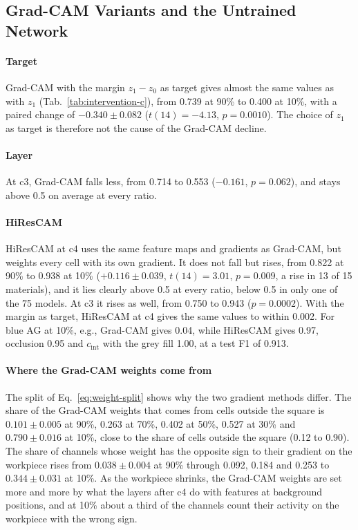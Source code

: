 \subsection{Grad-CAM Variants and the Untrained Network}
\label{sec:results-camvariants}

\paragraph{Target}
Grad-CAM with the margin $z_1 - z_0$ as target gives almost the same values as with
$z_1$ (Tab.~\ref{tab:intervention-c}), from 0.739 at 90\% to 0.400 at 10\%, with a
paired change of $-0.340 \pm 0.082$ ($t(14) = -4.13$, $p = 0.0010$). The choice of
$z_1$ as target is therefore not the cause of the Grad-CAM decline.

\paragraph{Layer}
At c3, Grad-CAM falls less, from 0.714 to 0.553 ($-0.161$, $p = 0.062$), and stays above
0.5 on average at every ratio.

\paragraph{HiResCAM}
HiResCAM at c4 uses the same feature maps and gradients as Grad-CAM, but weights every
cell with its own gradient. It does not fall but rises, from 0.822 at 90\% to 0.938 at
10\% ($+0.116 \pm 0.039$, $t(14) = 3.01$, $p = 0.009$, a rise in 13 of 15 materials), and
it lies clearly above 0.5 at every ratio, below 0.5 in only one of the 75 models. At c3 it
rises as well, from 0.750 to 0.943 ($p = 0.0002$). With the margin as target, HiResCAM at
c4 gives the same values to within 0.002. For blue AG at 10\%, e.g., Grad-CAM gives
0.04, while HiResCAM gives 0.97, occlusion 0.95 and $c_{\mathrm{int}}$ with the grey
fill 1.00, at a test F1 of 0.913.

\paragraph{Where the Grad-CAM weights come from}
The split of Eq.~\eqref{eq:weight-split} shows why the two gradient methods differ. The
share of the Grad-CAM weights that comes from cells outside the square is $0.101 \pm
0.005$ at 90\%, 0.263 at 70\%, 0.402 at 50\%, 0.527 at 30\% and $0.790 \pm 0.016$ at
10\%, close to the share of cells outside the square (0.12 to 0.90). The share of
channels whose weight has the opposite sign to their gradient on the workpiece rises
from $0.038 \pm 0.004$ at 90\% through 0.092, 0.184 and 0.253 to $0.344 \pm 0.031$ at
10\%. As the workpiece shrinks, the Grad-CAM weights are set more and more by what
the layers after c4 do with features at background positions, and at 10\% about a third
of the channels count their activity on the workpiece with the wrong sign.

